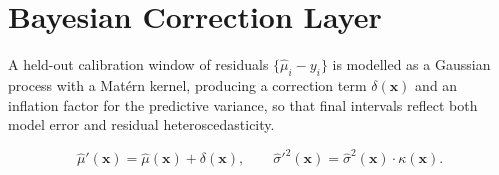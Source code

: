 \section{Bayesian Correction Layer}
A held-out calibration window of residuals $\{\hat{\mu}_i - y_i\}$ is modelled as a
Gaussian process with a Matérn kernel, producing a correction term $\delta(\mathbf{x})$ and
an inflation factor for the predictive variance, so that final intervals reflect both model
error and residual heteroscedasticity.

\begin{equation}
\label{eq:correction}
\hat{\mu}'(\mathbf{x}) = \hat{\mu}(\mathbf{x}) + \delta(\mathbf{x}), \qquad
\hat{\sigma}'^2(\mathbf{x}) = \hat{\sigma}^2(\mathbf{x}) \cdot \kappa(\mathbf{x}).
\end{equation}
